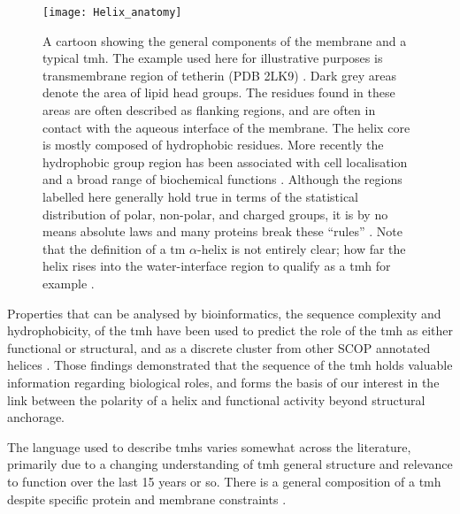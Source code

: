 \begin{figure}[!ht]
\centering
\texttt{[image: Helix\_anatomy]}
\caption{A cartoon showing the general components of the membrane and a typical \gls{tmh}. The example used here for illustrative purposes is transmembrane region of tetherin (PDB 2LK9) \cite{Skasko2012}. Dark grey areas denote the area of lipid head groups. The residues found in these areas are often described as flanking regions, and are often in contact with the aqueous interface of the membrane. The helix core is mostly composed of hydrophobic residues. More recently the hydrophobic group region has been associated with cell localisation and a broad range of biochemical functions \cite{Junne2010, Wong2012}. Although the regions labelled here generally hold true in terms of the statistical distribution of polar, non-polar, and charged groups, it is by no means absolute laws and many proteins break these ``rules'' \cite{Sharpe2010, Baeza-Delgado2013, Pogozheva2013}. Note that the definition of a \gls{tm} $\alpha$-helix is not entirely clear; how far the helix rises into the water-interface region to qualify as a \gls{tmh} for example \cite{VonHeijne2006}.}
\label{fig:helixcartoon1}
\end{figure}




Properties that can be analysed by bioinformatics, the sequence complexity and hydrophobicity, of the \gls{tmh} have been used to predict the role of the \gls{tmh} as either functional or structural, and as a discrete cluster from other SCOP annotated helices \cite{Wong2012}. Those findings demonstrated that the sequence of the \gls{tmh} holds valuable information regarding biological roles, and forms the basis of our interest in the link between the polarity of a helix and functional activity beyond structural anchorage.

The language used to describe \gls{tmh}s varies somewhat across the literature, primarily due to a changing understanding of \gls{tmh} general structure and relevance to function over the last 15 years or so. There is a general composition of a \gls{tmh} despite specific protein and membrane constraints \cite{Sharpe2010}.

